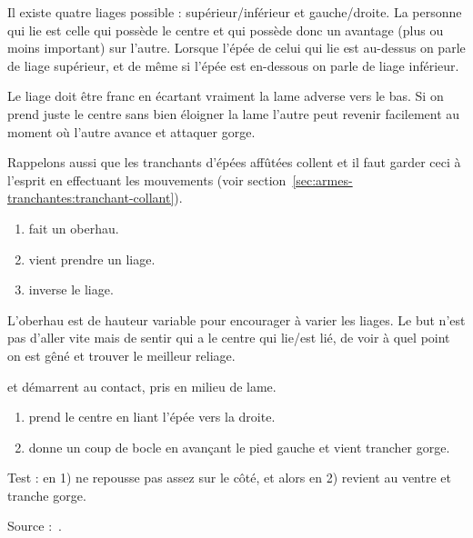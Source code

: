 
Il existe quatre liages possible : supérieur/inférieur et gauche/droite.
La personne qui lie est celle qui possède le centre et qui possède donc un avantage (plus ou moins important) sur l'autre.
Lorsque l'épée de celui qui lie est au-dessus on parle de liage supérieur, et de même si l'épée est en-dessous on parle de liage inférieur.

Le liage doit être franc en écartant vraiment la lame adverse vers le bas. Si on prend juste le centre sans bien éloigner la lame l'autre peut revenir facilement au moment où l'autre avance et attaquer gorge.

Rappelons aussi que les tranchants d'épées affûtées collent et il faut garder ceci à l'esprit en effectuant les mouvements (voir section~\ref{sec:armes-tranchantes:tranchant-collant}).


\begin{exercice}[Liages]

\begin{enumerate}
	\item \A fait un oberhau.
	\item \D vient prendre un liage.
	\item \A inverse le liage.
\end{enumerate}

L'oberhau est de hauteur variable pour encourager \D à varier les liages.
Le but n'est pas d'aller vite mais de sentir qui a le centre qui lie/est lié, de voir à quel point on est gêné et trouver le meilleur reliage.

\end{exercice}



\begin{technique}

\A et \D démarrent au contact, pris en milieu de lame.

\begin{enumerate}
	\item \A prend le centre en liant l'épée vers la droite.
	\item \A donne un coup de bocle en avançant le pied gauche et vient trancher gorge.
\end{enumerate}

Test : en 1) \A ne repousse pas assez sur le côté, et alors en 2) \D revient au ventre et tranche gorge.

Source :~\cite{fuhrmann:dijon:I33_liage:2015}.

\end{technique}


